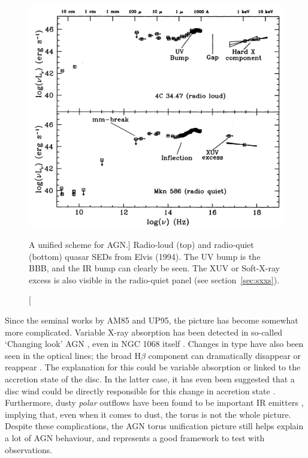 \nocite{elvis1994}
\begin{figure}
\centering
\includegraphics[width=1.0\textwidth]{figures/01-intro/quasar_sed.png}
\caption
[A unified scheme for AGN.]
{
Radio-loud (top) and radio-quiet (bottom) quasar SEDs from
Elvis (1994). The UV bump is the BBB, and the IR bump can clearly
be seen. The XUV or Soft-X-ray excess is also visible in the 
radio-quiet panel (see section~\ref{sec:sxxs}).
} 
\label{fig:quasar_sed}
\end{figure}

Since the seminal works by AM85 and UP95, 
the picture has become somewhat more complicated. 
Variable X-ray absorption has been detected in so-called `Changing look'
AGN \citep{matt2003,puccetti2007}, even in NGC 1068 itself \citep{marinucci2016}.
Changes in type have also been seen in the optical lines; 
the broad H$\beta$ component can dramatically disappear or reappear
\citep[e.g.][]{tohline1976,cohen1986,denney2014}. 
The explanation for this could be variable absorption \citep{elitzur2012}
or linked to the accretion state of the disc. In the latter case,
it has even been suggested that a disc wind could be directly responsible
for this change in accretion state \citep{elitzur2014}.
Furthermore, dusty {\em polar} outflows
have been found to be important IR emitters \citep{hoenig2013}, implying
that, even when it comes to dust, the torus is not the whole picture.
Despite these complications, the AGN torus unification picture still helps 
explain a lot of AGN behaviour, and represents a good framework 
to test with observations. 


